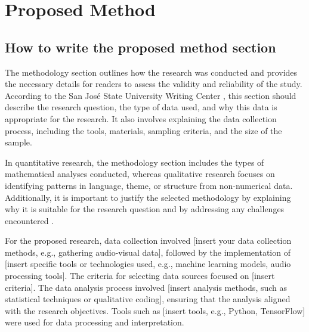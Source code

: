 
\setcounter{chapter}{2}
\chapter{Proposed Method} \label{chap::proposedMethod}
\section{How to write the proposed method section}
The methodology section outlines how the research was conducted and provides the necessary details for readers to assess the validity and reliability of the study. According to the San José State University Writing Center \cite{SJSUWritingCenterProposedMethod}, this section should describe the research question, the type of data used, and why this data is appropriate for the research. It also involves explaining the data collection process, including the tools, materials, sampling criteria, and the size of the sample.

In quantitative research, the methodology section includes the types of mathematical analyses conducted, whereas qualitative research focuses on identifying patterns in language, theme, or structure from non-numerical data. Additionally, it is important to justify the selected methodology by explaining why it is suitable for the research question and by addressing any challenges encountered \cite{SJSUWritingCenterProposedMethod}.

For the proposed research, data collection involved [insert your data collection methods, e.g., gathering audio-visual data], followed by the implementation of [insert specific tools or technologies used, e.g., machine learning models, audio processing tools]. The criteria for selecting data sources focused on [insert criteria]. The data analysis process involved [insert analysis methods, such as statistical techniques or qualitative coding], ensuring that the analysis aligned with the research objectives. Tools such as [insert tools, e.g., Python, TensorFlow] were used for data processing and interpretation.
